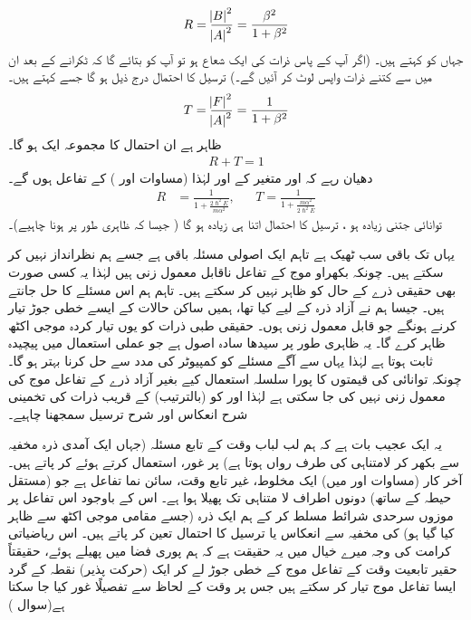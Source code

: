 \begin{align}
R=\frac{\abs B^{2}}{\abs A^{2}}=\frac{\beta^{2}}{1+\beta^{2}}
\end{align}
جہاں کو کہتے ہیں۔ (اگر آپ کے پاس ذرات کی ایک شعاع ہو تو  آپ کو بتائے گا کہ ٹکرانے کے بعد ان میں سے کتنے ذرات واپس لوٹ کر آئیں گے۔) ترسیل کا احتمال درج ذیل ہو گا جسے کہتے ہیں۔
\begin{align}
T=\frac{\abs F^{2}}{\abs A^{2}}=\frac{1}{1+\beta^{2}}
\end{align}
 ظاہر ہے ان احتمال کا مجموعہ ایک  ہو گا۔
 \begin{align}
 R+T=1
 \end{align}
 دھیان رہے کہ  اور  متغیر  کے اور لہٰذا (مساوات  اور )  کے تفاعل ہوں گے۔
 \begin{align}\label{مساوات_شروڈنگر_انعکاس_ترسیل_مستقل}
 R&=\frac{1}{1+\tfrac{2\hslash^{2}E}{m\alpha^{2}}},&& T =\frac{1}{1+\tfrac{m\alpha^{2}}{2\hslash^{2}E}}
 \end{align} 
توانائی جتنی زیادہ ہو ، ترسیل کا احتمال اتنا ہی زیادہ ہو گا ( جیسا کہ ظاہری طور پر ہونا چاہیے)۔ 
 
 یہاں تک باقی سب ٹھیک ہے تاہم ایک اصولی مسئلہ باقی ہے جسے ہم نظرانداز نہیں کر سکتے ہیں۔ چونکہ بکھراو موج کے تفاعل ناقابل  معمول زنی   ہیں لہٰذا یہ کسی صورت بھی حقیقی ذرے کے حال کو ظاہر نہیں کر سکتے ہیں۔ تاہم ہم اس مسئلے کا حل جانتے ہیں۔ جیسا ہم نے آزاد ذرہ کے لیے کیا تھا، ہمیں ساکن حالات کے ایسے خطی جوڑ تیار کرنے ہونگے جو قابل  معمول زنی  ہوں۔ حقیقی طبی ذرات کو یوں تیار کردہ موجی اکٹھ ظاہر کرے گا۔ یہ ظاہری طور پر سیدھا سادہ اصول ہے جو عملی استعمال میں پیچیدہ ثابت ہوتا ہے لہٰذا یہاں سے آگے مسئلے کو کمپیوٹر کی مدد سے حل کرنا بہتر ہو گا۔ چونکہ توانائی کی قیمتوں کا پورا سلسلہ استعمال کیے بغیر آزاد ذرے کے تفاعل موج کی  معمول زنی  نہیں کی جا سکتی   ہے لہٰذا  اور  کو (بالترتیب)  کے قریب ذرات کی تخمینی شرح انعکاس اور شرح ترسیل سمجھنا چاہیے۔ 
 
 یہ ایک عجیب بات ہے کہ ہم لب لباب وقت کے تابع مسئلہ (جہاں ایک آمدی ذرہ مخفیہ سے بکھر کر لامتناہی کی طرف رواں ہوتا ہے) پر غور،   استعمال کرتے ہوئے کر پاتے ہیں۔ آخر کار (مساوات  اور  میں) ایک مخلوط، غیر تابع وقت، سائن نما تفاعل ہے جو (مستقل حیطہ کے ساتھ) دونوں اطراف لا متناہی تک پھیلا ہوا ہے۔ اس کے باوجود اس تفاعل پر موزوں سرحدی شرائط مسلط کر کے ہم ایک ذرہ (جسے مقامی موجی اکٹھ سے ظاہر کیا گیا ہو) کی مخفیہ سے انعکاس یا ترسیل کا احتمال تعین کر پاتے ہیں۔ اس ریاضیاتی کرامت کی وجہ میرے خیال میں یہ حقیقت ہے کہ ہم پوری فضا میں پھیلے ہوئے، حقیقتاً حقیر تابعیت وقت کے  تفاعل موج کے خطی جوڑ لے کر ایک (حرکت پذیر) نقطہ کے گرد ایسا تفاعل موج تیار کر سکتے ہیں جس پر وقت کے لحاظ سے تفصیلًا غور کیا جا سکتا ہے(سوال )
 

